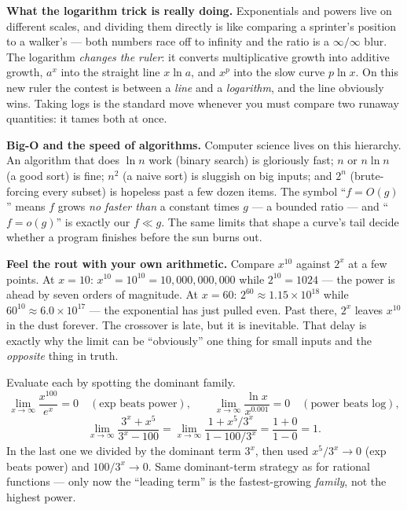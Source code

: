 \begin{happeningbox}
\textbf{What the logarithm trick is really doing.} Exponentials and powers live
on different scales, and dividing them directly is like comparing a sprinter's
position to a walker's --- both numbers race off to infinity and the ratio is a
$\infty/\infty$ blur. The logarithm \emph{changes the ruler}: it converts
multiplicative growth into additive growth, $a^x$ into the straight line
$x\ln a$, and $x^p$ into the slow curve $p\ln x$. On this new ruler the contest
is between a \emph{line} and a \emph{logarithm}, and the line obviously wins.
Taking logs is the standard move whenever you must compare two runaway
quantities: it tames both at once.
\end{happeningbox}

\begin{connectionbox}
\textbf{Big-O and the speed of algorithms.} Computer science lives on this
hierarchy. An algorithm that does $\ln n$ work (binary search) is gloriously
fast; $n$ or $n\ln n$ (a good sort) is fine; $n^2$ (a naive sort) is sluggish on
big inputs; and $2^n$ (brute-forcing every subset) is hopeless past a few dozen
items. The symbol ``$f = O(g)$'' means $f$ grows \emph{no faster than} a constant
times $g$ --- a bounded ratio --- and ``$f = o(g)$'' is exactly our $f\ll g$.
The same limits that shape a curve's tail decide whether a program finishes
before the sun burns out.
\end{connectionbox}

\begin{labbox}
\textbf{Feel the rout with your own arithmetic.} Compare $x^{10}$ against $2^x$
at a few points. At $x=10$: $x^{10}=10^{10}=10{,}000{,}000{,}000$ while
$2^{10}=1024$ --- the power is ahead by seven orders of magnitude. At $x=60$:
$2^{60}\approx 1.15\times 10^{18}$ while $60^{10}\approx 6.0\times 10^{17}$ --- the
exponential has just pulled even. Past there, $2^x$ leaves $x^{10}$ in the dust
forever. The crossover is late, but it is inevitable. That delay is exactly why
the limit can be ``obviously'' one thing for small inputs and the \emph{opposite}
thing in truth.
\end{labbox}

\begin{example}
\label{ch09:ex-hierarchy}
Evaluate each by spotting the dominant family.
\[
\lim_{x\to\infty}\frac{x^{100}}{e^x}=0
\quad(\text{exp beats power}),
\qquad
\lim_{x\to\infty}\frac{\ln x}{x^{0.001}}=0
\quad(\text{power beats log}),
\]
\[
\lim_{x\to\infty}\frac{3^x + x^5}{3^x - 100}
= \lim_{x\to\infty}\frac{1 + x^5/3^x}{1 - 100/3^x}
= \frac{1+0}{1-0}=1 .
\]
In the last one we divided by the dominant term $3^x$, then used
$x^5/3^x\to 0$ (exp beats power) and $100/3^x\to 0$. Same dominant-term
strategy as for rational functions --- only now the ``leading term'' is the
fastest-growing \emph{family}, not the highest power.
\end{example}

